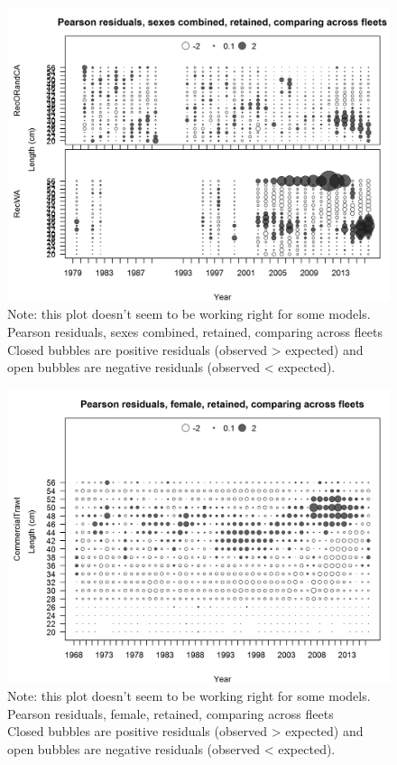 \documentclass[12pt,]{article}
\begin{document}
\begin{figure}[htbp]
\centering
\includegraphics{./r4ss/plots_mod1/comp_lenfit_sex1mkt2_multi-fleet_comparison.png}
\caption{Note: this plot doesn't seem to be working right for some
models. Pearson residuals, sexes combined, retained, comparing across
fleets\\
Closed bubbles are positive residuals (observed \textgreater{} expected)
and open bubbles are negative residuals (observed \textless{} expected).
\label{fig:mod1_32_comp_lenfit_sex1mkt2_multi-fleet_comparison}}
\end{figure}

\begin{figure}[htbp]
\centering
\includegraphics{./r4ss/plots_mod1/comp_lenfit_sex2mkt2_multi-fleet_comparison.png}
\caption{Note: this plot doesn't seem to be working right for some
models. Pearson residuals, female, retained, comparing across fleets\\
Closed bubbles are positive residuals (observed \textgreater{} expected)
and open bubbles are negative residuals (observed \textless{} expected).
\label{fig:mod1_33_comp_lenfit_sex2mkt2_multi-fleet_comparison}}
\end{figure}
\end{document}
